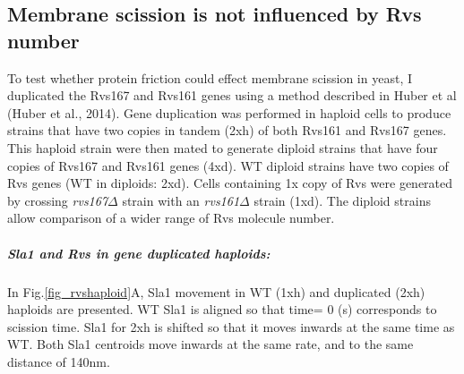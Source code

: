 	\subsection{Membrane scission is not influenced by Rvs number}
To test whether protein friction could effect membrane scission in yeast, I duplicated the Rvs167 and Rvs161 genes using a method described in Huber et al (Huber et al., 2014). Gene duplication was performed in haploid cells to produce strains that have two copies in tandem (2xh) of both Rvs161 and Rvs167 genes. This haploid strain were then mated to generate diploid strains that have four copies of Rvs167 and Rvs161 genes (4xd). WT diploid strains have two copies of Rvs genes (WT in diploids: 2xd). Cells containing 1x copy of Rvs were generated by crossing \textit{rvs167$\Delta$}
 strain with an \textit{rvs161$\Delta$} strain (1xd). The diploid strains allow comparison of a wider range of Rvs molecule number. 



	

		\subparagraph{Sla1 and Rvs in gene duplicated haploids:}

In Fig.\ref{fig_rvshaploid}A, Sla1 movement in WT (1xh) and duplicated (2xh) haploids are presented. WT Sla1 is aligned so that time= 0 (s) corresponds to scission time. Sla1 for 2xh is shifted so that it moves inwards at the same time as WT. Both Sla1 centroids move inwards at the same rate, and to the same distance of 140nm. 

